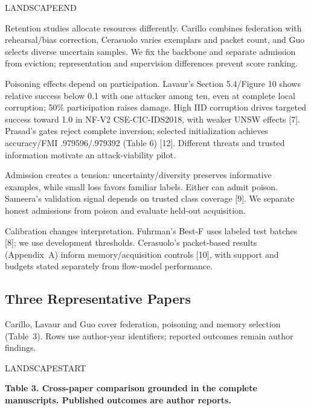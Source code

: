 \documentclass[10pt,a4paper]{article}
\begin{document}
\par LANDSCAPEEND



Retention studies allocate resources differently. Carillo combines federation with rehearsal/bias correction, Cerasuolo varies exemplars and packet count, and Guo selects diverse uncertain samples. We fix the backbone and separate admission from eviction; representation and supervision differences prevent score ranking.

Poisoning effects depend on participation. Lavaur's Section 5.4/Figure 10 shows relative success below 0.1 with one attacker among ten, even at complete local corruption; 50\% participation raises damage. High IID corruption drives targeted success toward 1.0 in NF-V2 CSE-CIC-IDS2018, with weaker UNSW effects [7]. Prasad's gates reject complete inversion; selected initialization achieves accuracy/FMI .979596/.979392 (Table 6) [12]. Different threats and trusted information motivate an attack-viability pilot.

Admission creates a tension: uncertainty/diversity preserves informative examples, while small loss favors familiar labels. Either can admit poison. Sameera's validation signal depends on trusted class coverage [9]. We separate honest admissions from poison and evaluate held-out acquisition.

Calibration changes interpretation. Fuhrman's Best-F uses labeled test batches [8]; we use development thresholds. Cerasuolo's packet-based results (Appendix~A) inform memory/acquisition controls [10], with support and budgets stated separately from flow-model performance.

\subsection{Three Representative Papers}
Carillo, Lavaur and Guo cover federation, poisoning and memory selection (Table~3). Rows use author-year identifiers; reported outcomes remain author findings.


\par LANDSCAPESTART



\centering\footnotesize
\par\textbf{Table 3. Cross-paper comparison grounded in the complete manuscripts. Published outcomes are author reports.}\par
\end{document}
